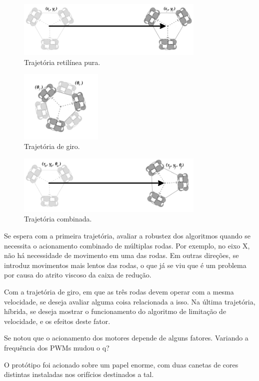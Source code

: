 \begin{figure}[h]
  \centering
  \includegraphics[width = 0.8\textwidth]{imagens/reta}
  \caption{Trajetória retilínea pura.}
  \label{fig:reta}
\end{figure}

\begin{figure}[h]
  \centering
  \includegraphics[width = 0.35\textwidth]{imagens/giro}
  \caption{Trajetória de giro.}
  \label{fig:giro}
\end{figure}

\begin{figure}[h]
  \centering
  \includegraphics[width = 0.8\textwidth]{imagens/hibrida}
  \caption{Trajetória combinada.}
  \label{fig:hibrida}
\end{figure}

Se espera com a primeira trajetória, avaliar a robustez dos algoritmos quando se necessita o acionamento combinado de múltiplas rodas. Por exemplo, no eixo X, não há necessidade de movimento em uma das rodas. Em outras direções, se introduz movimentos mais lentos das rodas, o que já se viu que é um problema por causa do atrito viscoso da caixa de redução.

Com a trajetória de giro, em que as três rodas devem operar com a mesma velocidade, se deseja avaliar alguma coisa relacionada a isso. Na última trajetória, híbrida, se deseja mostrar o funcionamento do algoritmo de limitação de velocidade, e os efeitos deste fator.

Se notou que o acionamento dos motores depende de alguns fatores. Variando a frequência dos PWMs mudou o q?

O protótipo foi acionado sobre um papel enorme, com duas canetas de cores distintas instaladas nos orifícios destinados a tal.
